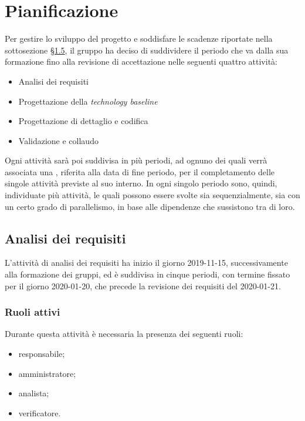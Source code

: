 \section{Pianificazione}

	Per gestire lo sviluppo del progetto e soddisfare le scadenze riportate nella sottosezione \hyperref[riferimento_scadenze]{\S1.5}, il gruppo ha deciso di suddividere il periodo che va dalla sua formazione fino alla revisione di accettazione nelle seguenti quattro attività:
	\begin{itemize}
		\item Analisi dei requisiti
		\item Progettazione della \textit{technology baseline}
		\item Progettazione di dettaglio e codifica
		\item Validazione e collaudo
	\end{itemize}
	Ogni attività sarà poi suddivisa in più periodi, ad ognuno dei quali verrà associata una , riferita alla data di fine periodo, per il completamento delle singole attività previste al suo interno. In ogni singolo periodo sono, quindi, individuate più attività, le quali possono essere svolte sia sequenzialmente, sia con un certo grado di parallelismo, in base alle dipendenze che sussistono tra di loro.
	
	\subsection{Analisi dei requisiti}
	
		L'attività di analisi dei requisiti ha inizio il giorno 2019-11-15, successivamente alla formazione dei gruppi, ed è suddivisa in cinque periodi, con termine fissato per il giorno 2020-01-20, che precede la revisione dei requisiti del 2020-01-21.
		
		\subsubsection{Ruoli attivi}
		
			Durante questa attività è necessaria la presenza dei seguenti ruoli:
			\begin{itemize}
				\item responsabile;
				\item amministratore;
				\item analista;
				\item verificatore.
			\end{itemize}
		
